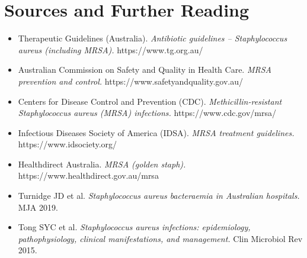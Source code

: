 \section*{Sources and Further Reading}
\begin{itemize}
    \item Therapeutic Guidelines (Australia). \textit{Antibiotic guidelines -- Staphylococcus aureus (including MRSA).} https://www.tg.org.au/
    \item Australian Commission on Safety and Quality in Health Care. \textit{MRSA prevention and control.} https://www.safetyandquality.gov.au/
    \item Centers for Disease Control and Prevention (CDC). \textit{Methicillin-resistant Staphylococcus aureus (MRSA) infections.} https://www.cdc.gov/mrsa/
    \item Infectious Diseases Society of America (IDSA). \textit{MRSA treatment guidelines.} https://www.idsociety.org/
    \item Healthdirect Australia. \textit{MRSA (golden staph).} https://www.healthdirect.gov.au/mrsa
    \item Turnidge JD et al. \textit{Staphylococcus aureus bacteraemia in Australian hospitals.} MJA 2019.
    \item Tong SYC et al. \textit{Staphylococcus aureus infections: epidemiology, pathophysiology, clinical manifestations, and management.} Clin Microbiol Rev 2015.
\end{itemize}

\clearpage